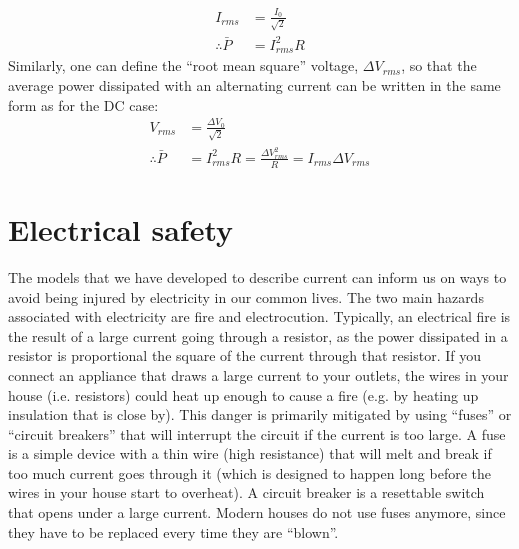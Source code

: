 \begin{align*}
I_{rms}&=\frac{I_0}{\sqrt 2}\\
\therefore\bar P&=I_{rms}^2R
\end{align*}
Similarly, one can define the ``root mean square'' voltage, $\Delta V_{rms}$, so that the average power dissipated with an alternating current can be written in the same form as for the DC case:
\begin{align*}
V_{rms}&=\frac{\Delta V_0}{\sqrt 2}\\
\therefore\bar P&=I_{rms}^2R =\frac{\Delta V_{rms}^2}{R}=I_{rms}\Delta V_{rms}
\end{align*}

\section{Electrical safety}
The models that we have developed to describe current can inform us on ways to avoid being injured by electricity in our common lives. The two main hazards associated with electricity are fire and electrocution. Typically, an electrical fire is the result of a large current going through a resistor, as the power dissipated in a resistor is proportional the square of the current through that resistor. If you connect an appliance that draws a large current to your outlets, the wires in your house (i.e. resistors) could heat up enough to cause a fire (e.g. by heating up insulation that is close by). This danger is primarily mitigated by using ``fuses'' or ``circuit breakers'' that will interrupt the circuit if the current is too large. A fuse is a simple device with a thin wire (high resistance) that will melt and break if too much current goes through it (which is designed to happen long before the wires in your house start to overheat). A circuit breaker is a resettable switch that opens under a large current. Modern houses do not use fuses anymore, since they have to be replaced every time they are ``blown''.

